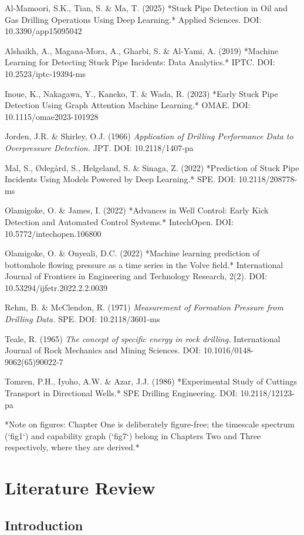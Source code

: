 \documentclass[12pt,a4paper]{report}
\begin{document}
Al-Mamoori, S.K., Tian, S. \& Ma, T. (2025) *Stuck Pipe Detection in Oil and Gas Drilling Operations Using
Deep Learning.* Applied Sciences. DOI: 10.3390/app15095042

Alshaikh, A., Magana-Mora, A., Gharbi, S. \& Al-Yami, A. (2019) *Machine Learning for Detecting Stuck Pipe
Incidents: Data Analytics.* IPTC. DOI: 10.2523/iptc-19394-ms

Inoue, K., Nakagawa, Y., Kaneko, T. \& Wada, R. (2023) *Early Stuck Pipe Detection Using Graph Attention
Machine Learning.* OMAE. DOI: 10.1115/omae2023-101928

Jorden, J.R. \& Shirley, O.J. (1966) \emph{Application of Drilling Performance Data to Overpressure Detection.}
JPT. DOI: 10.2118/1407-pa

Mal, S., Ødegård, S., Helgeland, S. \& Sinaga, Z. (2022) *Prediction of Stuck Pipe Incidents Using Models
Powered by Deep Learning.* SPE. DOI: 10.2118/208778-ms

Olamigoke, O. \& James, I. (2022) *Advances in Well Control: Early Kick Detection and Automated Control
Systems.* IntechOpen. DOI: 10.5772/intechopen.106800

Olamigoke, O. \& Onyeali, D.C. (2022) *Machine learning prediction of bottomhole flowing pressure as a time
series in the Volve field.* International Journal of Frontiers in Engineering and Technology Research, 2(2).
DOI: 10.53294/ijfetr.2022.2.2.0039

Rehm, B. \& McClendon, R. (1971) \emph{Measurement of Formation Pressure from Drilling Data.} SPE. DOI:
10.2118/3601-ms

Teale, R. (1965) \emph{The concept of specific energy in rock drilling.} International Journal of Rock
Mechanics and Mining Sciences. DOI: 10.1016/0148-9062(65)90022-7

Tomren, P.H., Iyoho, A.W. \& Azar, J.J. (1986) *Experimental Study of Cuttings Transport in Directional
Wells.* SPE Drilling Engineering. DOI: 10.2118/12123-pa

*Note on figures: Chapter One is deliberately figure-free; the timescale spectrum (`fig1`) and capability
graph (`fig7`) belong in Chapters Two and Three respectively, where they are derived.*


\chapter{Literature Review}

\section{Introduction}
\end{document}
